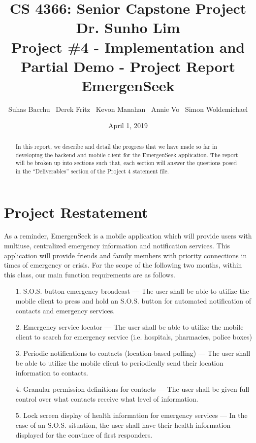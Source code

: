 \documentclass[10pt, a4paper]{article}
\title{\large CS 4366: Senior Capstone Project \\ Dr. Sunho Lim \\ Project \#4 - Implementation and Partial Demo - Project Report \\ EmergenSeek}
\author{Suhas Bacchu \ Derek Fritz \ Kevon Manahan \ Annie Vo \ Simon Woldemichael}
\date{April 1, 2019}
\begin{document}
\maketitle
\vspace{-1cm}
\begin{abstract}
In this report, we describe and detail the progress that we have made so far in developing the backend and mobile client for the EmergenSeek application. The report will be broken up into sections such that, each section will answer the questions posed in the ``Deliverables'' section of the Project 4 statement file.
\end{abstract}

\section{Project Restatement} 
\label{sec:pr}
As a reminder, EmergenSeek is a mobile application which will provide users with multiuse, centralized emergency information and notification services. This application will provide friends and family members with priority connections in times of emergency or crisis. For the scope of the following two months, within this class, our main function requirements are as follows.
\begin{enumerate}
	\item[1.] S.O.S. button emergency broadcast --- The user shall be able to utilize the mobile client to press and hold an S.O.S. button for automated notification of contacts and emergency services.
	\item[2.] Emergency service locator --- The user shall be able to utilize the mobile client to search for emergency service (i.e. hospitals, pharmacies, police boxes)
	\item[3.] Periodic notifications to contacts (location-based polling) --- The user shall be able to utilize the mobile client to periodically send their location information to contacts.
	\item[4.] Granular permission definitions for contacts --- The user shall be given full control over what contacts receive what level of information.
	\item[5.] Lock screen display of health information for emergency services --- In the case of an S.O.S. situation, the user shall have their health information displayed for the convince of first responders.
\end{enumerate}
\end{document}
